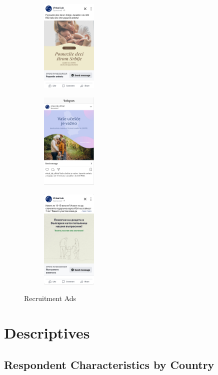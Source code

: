 \documentclass{article}
\begin{document}
\begin{figure}[H]
\centering
\begin{subfigure}{0.3\textwidth}
\centering
\includegraphics[width=100px]{images/recruitment/558.png}
\end{subfigure}
\begin{subfigure}{0.3\textwidth}
\centering
\includegraphics[width=100px]{images/recruitment/639.png}
\end{subfigure}
\begin{subfigure}{0.3\textwidth}
\centering
\includegraphics[width=100px]{images/recruitment/742.png}
\end{subfigure}
\caption{Recruitment Ads}
\label{fig:Recruitment Ads}
\end{figure}


\section{Descriptives}


\subsection*{Respondent Characteristics by Country}
\end{document}
